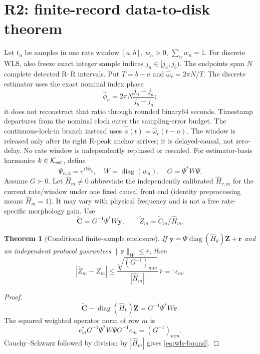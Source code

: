 \documentclass[11pt]{article}
\newtheorem{theorem}{Theorem}
\theoremstyle{definition}
\theoremstyle{remark}
\newcommand{\Kset}{\mathcal K_{\rm est}}
\begin{document}
\section{R2: finite-record data-to-disk theorem}

Let \(t_n\) be samples in one rate window \([a,b]\), \(w_n>0\),
\(\sum_nw_n=1\).  For discrete WLS, also freeze exact integer sample indices
\(j_n\in[j_a,j_b)\).  The endpoints span \(N\) complete detected R--R
intervals.  Put \(T=b-a\) and \(\widehat\omega_r=2\pi N/T\).  The discrete
estimator uses the exact nominal index phase
\[
 \widehat\phi_n=2\pi N\frac{j_n-j_a}{j_b-j_a};
\]
it does not reconstruct that ratio through rounded binary64 seconds.
Timestamp departures from the nominal clock enter the sampling-error budget.
The continuous-lock-in branch instead uses
\(\widehat\phi(t)=\widehat\omega_r(t-a)\).  The window is released only after
its right R-peak anchor arrives; it is delayed-causal, not zero-delay.
No rate window is independently rephased or rescaled.  For estimator-basis
harmonics \(k\in\Kset\), define
\[
 \Psi_{n,k}=e^{ik\widehat\phi_n},\quad
 W=\operatorname{diag}(w_n),\quad G=\Psi^*W\Psi.
\]
Assume \(G\succ0\).  Let \(\widehat H_m\ne0\) abbreviate the independently
calibrated \(\widehat H_{r,m}\) for the current rate/window under one fixed
causal front end (identity preprocessing means \(\widehat H_m=1\)).  It may
vary with physical frequency and is not a free rate-specific morphology gain.
Use
\begin{equation}
 \widetilde{\boldsymbol C}=G^{-1}\Psi^*W\boldsymbol y,\qquad
 \widetilde Z_m=\widetilde C_m/\widehat H_m.
 \label{eq:wls}
\end{equation}

\begin{theorem}[Conditional finite-sample enclosure]
\label{thm:wls}
If \(\boldsymbol y=\Psi\operatorname{diag}(\widehat H_k)
\boldsymbol Z+\boldsymbol r\) and an independent protocol
guarantees \(\|\boldsymbol r\|_W\le\bar r\), then
\begin{equation}
 |\widetilde Z_m-Z_m|
 \le\frac{\sqrt{(G^{-1})_{mm}}}{|\widehat H_m|}\,\bar r
 =:\epsilon_m.
 \label{eq:wls-bound}
\end{equation}
\end{theorem}
\begin{proof}
\[
 \widetilde{\boldsymbol C}
 -\operatorname{diag}(\widehat H_k)\boldsymbol Z
 =G^{-1}\Psi^*W\boldsymbol r.
\]
The squared weighted operator norm of row \(m\) is
\[
 e_m^*G^{-1}\Psi^*W\Psi G^{-1}e_m=(G^{-1})_{mm}.
\]
Cauchy--Schwarz followed by division by \(|\widehat H_m|\) gives
\eqref{eq:wls-bound}.
\end{proof}
\end{document}
